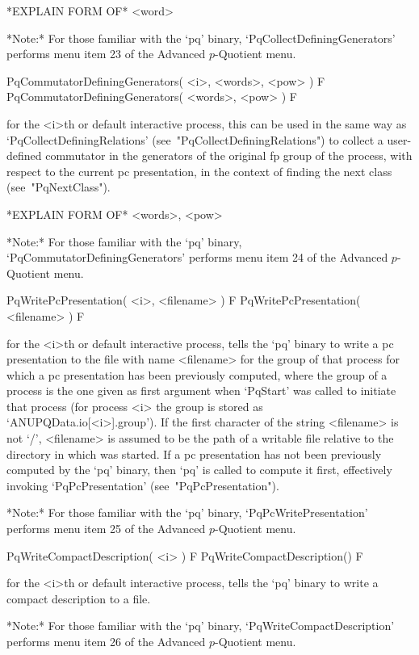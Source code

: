 *EXPLAIN FORM OF* <word>

*Note:*
For those familiar with the  `pq'  binary,  `PqCollectDefiningGenerators'
performs menu item 23 of the Advanced $p$-Quotient menu.

\>PqCommutatorDefiningGenerators( <i>, <words>, <pow> ) F
\>PqCommutatorDefiningGenerators( <words>, <pow> ) F

for the <i>th or default interactive {\ANUPQ} process, this can  be  used
in      the      same      way      as       `PqCollectDefiningRelations'
(see~"PqCollectDefiningRelations") to collect a  user-defined  commutator
in the generators of the original fp group of the process,  with  respect
to the current pc presentation, in the context of finding the next  class
(see~"PqNextClass").

*EXPLAIN FORM OF* <words>, <pow>

*Note:*
For those familiar with the `pq' binary, `PqCommutatorDefiningGenerators'
performs menu item 24 of the Advanced $p$-Quotient menu.

\>PqWritePcPresentation( <i>, <filename> ) F
\>PqWritePcPresentation( <filename> ) F

for the <i>th or default interactive {\ANUPQ}  process,  tells  the  `pq'
binary to write a pc presentation to the file with  name  <filename>  for
the group of that process for which a pc presentation has been previously
computed, where the group of a process is the one given as first argument
when `PqStart' was called to initiate that process (for process  <i>  the
group is stored as `ANUPQData.io[<i>].group'). If the first character  of
the string <filename> is not `/', <filename> is assumed to be the path of
a writable file relative to the directory in which {\GAP} was started. If
a pc presentation has not been previously computed by  the  `pq'  binary,
then  `pq'  is  called  to  compute  it   first,   effectively   invoking
`PqPcPresentation' (see~"PqPcPresentation").

*Note:* For those familiar with the `pq' binary,  `PqPcWritePresentation'
performs menu item 25 of the Advanced $p$-Quotient menu.

\>PqWriteCompactDescription( <i> ) F
\>PqWriteCompactDescription() F

for the <i>th or default interactive {\ANUPQ}  process,  tells  the  `pq'
binary to write a compact description to a file.

*Note:* 
For those familiar  with  the  `pq'  binary,  `PqWriteCompactDescription'
performs menu item 26 of the Advanced $p$-Quotient menu.

